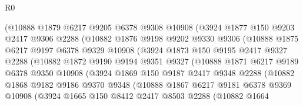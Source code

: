 \begin{lexlean}{R0}
\begin{coremodule}
                (@10888
                  @1879
                  @6217
                  @9205
                  @6378
                  @9308
                  @10908
                  (@3924
                    @1877
                    @150
                    @9203
                    @2417
                    @9306
                    @2288
                    (@10882
                      @1876
                      @9198
                      @9202
                      @9330
                      @9306
                      (@10888
                        @1875
                        @6217
                        @9197
                        @6378
                        @9329
                        @10908
                        (@3924
                          @1873
                          @150
                          @9195
                          @2417
                          @9327
                          @2288
                          (@10882
                            @1872
                            @9190
                            @9194
                            @9351
                            @9327
                            (@10888
                              @1871
                              @6217
                              @9189
                              @6378
                              @9350
                              @10908
                              (@3924
                                @1869
                                @150
                                @9187
                                @2417
                                @9348
                                @2288
                                (@10882
                                  @1868
                                  @9182
                                  @9186
                                  @9370
                                  @9348
                                  (@10888
                                    @1867
                                    @6217
                                    @9181
                                    @6378
                                    @9369
                                    @10908
                                    (@3924
                                      @1665
                                      @150
                                      @8412
                                      @2417
                                      @8503
                                      @2288
                                      (@10882
                                        @1664

\end{coremodule}
\end{lexlean}

